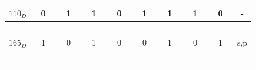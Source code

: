 \documentclass[10pt,a4paper,boxed]{hmcpset}
\begin{document}
\begin{table}[h!]
\begin{tabular}{|c|c|c|c|c|c|c|c|c|c|}
		$110_D$ & 0 & 1 & 1 & 0 & 1 & 1 & 1 & 0 & - \\ 
		\hline  & \includegraphics[width=0.03\textwidth]{img/1.pdf} & \includegraphics[width=0.03\textwidth]{img/0.pdf} & \includegraphics[width=0.03\textwidth]{img/1.pdf} & \includegraphics[width=0.03\textwidth]{img/0.pdf} & \includegraphics[width=0.03\textwidth]{img/0.pdf} & \includegraphics[width=0.03\textwidth]{img/1.pdf} & \includegraphics[width=0.03\textwidth]{img/0.pdf} & \includegraphics[width=0.03\textwidth]{img/1.pdf} &  \\ 
		$165_D$ & 1 & 0 & 1 & 0 & 0 & 1 & 0 & 1 & s,p \\  
		\hline  & \includegraphics[width=0.03\textwidth]{img/1.pdf} & \includegraphics[width=0.03\textwidth]{img/1.pdf} & \includegraphics[width=0.03\textwidth]{img/0.pdf} & \includegraphics[width=0.03\textwidth]{img/0.pdf} & \includegraphics[width=0.03\textwidth]{img/1.pdf} & \includegraphics[width=0.03\textwidth]{img/1.pdf} & \includegraphics[width=0.03\textwidth]{img/0.pdf} & \includegraphics[width=0.03\textwidth]{img/0.pdf} &  \\ 

\end{tabular}
\end{table}
\end{document}
